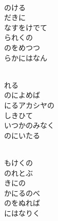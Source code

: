 \documentclass[10pt,b5j]{tarticle} %
\begin{document}
\vspace{1.5em} %
\newcommand{\linespace}{0.5em} %
\newcommand{\blocksize}{0.5\hsize} %
\newcommand{\itemmargin}{6em} %
\begin{enumerate} %
    \setlength{\itemindent}{\itemmargin} %
    \begin{minipage}[c]{\blocksize}
    
        \vspace{\linespace}
        \item~\\
        のける\\
        だきに\\
        なすをけでて\\
        られくの\\
        のをめつつ\\
        らかにはなん
        
        \vspace{\linespace}
        \item~\\
        れる\\
        のによめば\\
        にるアカシヤの\\
        しきひて\\
        いつかのみなく\\
        のにいたる
        
        \vspace{\linespace}
        \item~\\
        もけくの\\
        のれとぶ\\
        きにの\\
        かにるのべ\\
        のをぬれば\\
        にはなりく
        

\end{minipage}
\end{enumerate}
\end{document}
